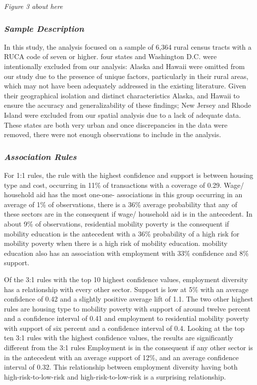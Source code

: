 \textit{Figure 3 about here}

\subsubsection{\textit{Sample Description}}

In this study, the analysis focused on a sample of 6,364 rural census tracts with a RUCA code of seven or higher. four states and Washington D.C. were intentionally excluded from our analysis: Alaska and Hawaii were omitted from our study due to the presence of unique factors, particularly in their rural areas, which may not have been adequately addressed in the existing literature. Given their geographical isolation and distinct characteristics Alaska, and Hawaii to ensure the accuracy and generalizability of these findings; New Jersey and Rhode Island were excluded from our spatial analysis due to a lack of adequate data. These states are both very urban and once discrepancies in the data were removed, there were not enough observations to include in the analysis.  

\subsubsection{\textit{Association Rules}}
For 1:1 rules, the rule with the highest confidence and support is between housing type and cost, occurring in 11\% of transactions with a coverage of 0.29. Wage/ household aid has the most one-one- associations in this group occurring in an average of 1\% of observations, there is a 36\% average probability that any of these sectors are in the consequent if wage/ household aid is in the antecedent. In about 9\% of observations, residential mobility poverty is the consequent if mobility education is the antecedent with a 36\% probability of a high risk for mobility poverty when there is a high risk of mobility education. mobility education also has an association with employment with 33\% confidence and 8\% support. 

Of the 3:1 rules with the top 10 highest confidence values, employment diversity has a relationship with every other sector. Support is low at 5\% with an average confidence of 0.42 and a slightly positive average lift of 1.1. The two other highest rules are housing type to mobility poverty with support of around twelve percent and a confidence interval of 0.41 and employment to residential mobility poverty with support of six percent and a confidence interval of 0.4. Looking at the top ten 3:1 rules with the highest confidence values, the results are significantly different from the 3:1 rules Employment is in the consequent if any other sector is in the antecedent with an average support of 12\%, and an average confidence interval of 0.32. This relationship between employment diversity having both high-risk-to-low-risk and high-risk-to-low-risk is a surprising relationship. 

